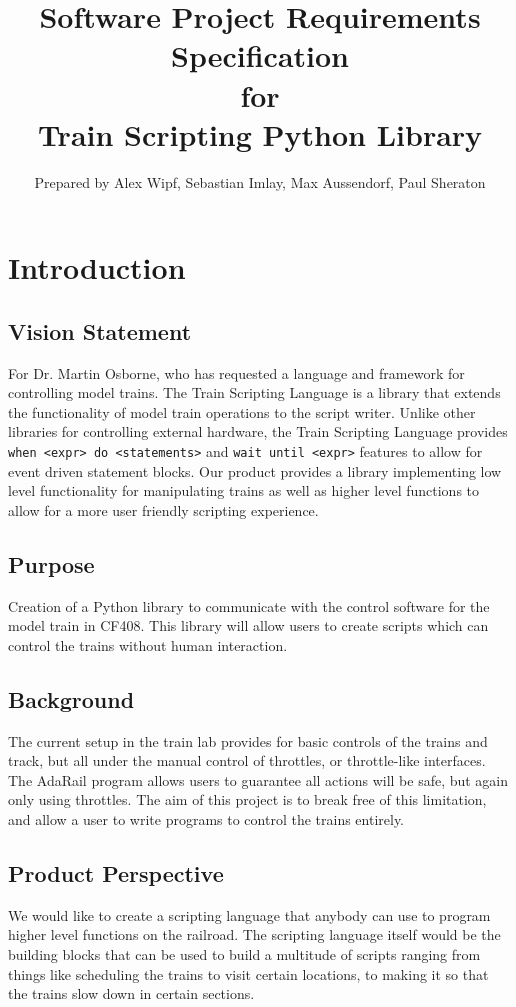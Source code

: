 \documentclass[a4paper,11pt,notitlepage]{article}
\title{{\bf Software Project Requirements Specification} \\ for \\ {\bf Train Scripting Python Library}}
\author{Prepared by Alex Wipf, Sebastian Imlay, Max Aussendorf, Paul Sheraton}
\def\TSL{Train Scripting Language\xspace}
\begin{document}
\maketitle
\pagebreak
\tableofcontents

\newpage
\section{Introduction}
\subsection{Vision Statement}
For Dr. Martin Osborne, who has requested a language and framework for controlling model trains.  The \TSL is a library that extends the functionality of model train operations to the script writer.  Unlike other libraries for controlling external hardware, the \TSL provides \verb=when <expr> do <statements>= and \verb=wait until <expr>= features to allow for event driven statement blocks.  Our product provides a library implementing low level functionality for manipulating trains as well as higher level functions to allow for a more user friendly scripting experience.
\subsection{Purpose}
Creation of a Python library to communicate with the control software for the model train in CF408. This library will allow users to create scripts which can control the trains without human interaction.
\subsection{Background}
The current setup in the train lab provides for basic controls of the trains and track, but all under the manual control of throttles, or throttle-like interfaces. The AdaRail program allows users to guarantee all actions will be safe, but again only using throttles. The aim of this project is to break free of this limitation, and allow a user to write programs to control the trains entirely.
\subsection{Product Perspective}
We would like to create a scripting language that anybody can use to program higher level functions on the railroad. The scripting language itself would be the building blocks that can be used to build a multitude of scripts ranging from things like scheduling the trains to visit certain locations, to making it so that the trains slow down in certain sections.
\end{document}
